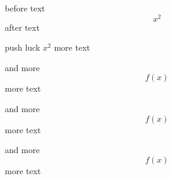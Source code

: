 before text 
\[ 
	x^2 
\]
after text

push luck $x^2$ more text

and more \[ 
	f(x) \] more text

and more \[ 
	f(x) \] more text

and more \[ 
	f(x) \] more text
